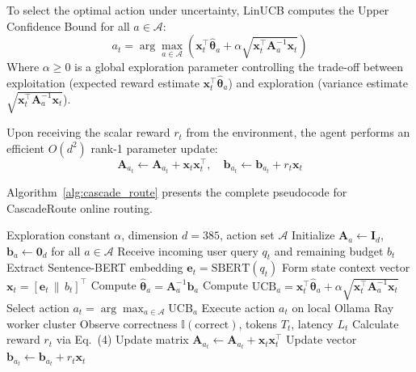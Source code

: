 \documentclass{article}
\begin{document}
To select the optimal action under uncertainty, LinUCB computes the Upper Confidence Bound for all $a \in \mathcal{A}$:
\begin{equation}
    a_t = \arg\max_{a \in \mathcal{A}} \left( \mathbf{x}_t^\top \hat{\boldsymbol{\theta}}_a + \alpha \sqrt{\mathbf{x}_t^\top \mathbf{A}_a^{-1} \mathbf{x}_t} \right)
\label{eq:linucb_select}
\end{equation}
Where $\alpha \ge 0$ is a global exploration parameter controlling the trade-off between exploitation (expected reward estimate $\mathbf{x}_t^\top \hat{\boldsymbol{\theta}}_a$) and exploration (variance estimate $\sqrt{\mathbf{x}_t^\top \mathbf{A}_a^{-1} \mathbf{x}_t}$).

Upon receiving the scalar reward $r_t$ from the environment, the agent performs an efficient $O(d^2)$ rank-1 parameter update:
\begin{equation}
    \mathbf{A}_{a_t} \leftarrow \mathbf{A}_{a_t} + \mathbf{x}_t \mathbf{x}_t^\top, \quad \mathbf{b}_{a_t} \leftarrow \mathbf{b}_{a_t} + r_t \mathbf{x}_t
\end{equation}

Algorithm~\ref{alg:cascade_route} presents the complete pseudocode for CascadeRoute online routing.

\begin{algorithm}[t]
\caption{CascadeRoute: LinUCB LLM Routing Protocol}
\label{alg:cascade_route}
\begin{algorithmic}[1]
\REQUIRE Exploration constant $\alpha$, dimension $d=385$, action set $\mathcal{A}$
\STATE Initialize $\mathbf{A}_a \leftarrow \mathbf{I}_d$, $\mathbf{b}_a \leftarrow \mathbf{0}_d$ for all $a \in \mathcal{A}$
    \STATE Receive incoming user query $q_t$ and remaining budget $b_t$
    \STATE Extract Sentence-BERT embedding $\mathbf{e}_t = \text{SBERT}(q_t)$
    \STATE Form state context vector $\mathbf{x}_t = [\mathbf{e}_t \,\|\, b_t]^\top$
        \STATE Compute $\hat{\boldsymbol{\theta}}_a = \mathbf{A}_a^{-1} \mathbf{b}_a$
        \STATE Compute $\text{UCB}_a = \mathbf{x}_t^\top \hat{\boldsymbol{\theta}}_a + \alpha \sqrt{\mathbf{x}_t^\top \mathbf{A}_a^{-1} \mathbf{x}_t}$
    \ENDFOR
    \STATE Select action $a_t = \arg\max_{a \in \mathcal{A}} \text{UCB}_a$
    \STATE Execute action $a_t$ on local Ollama Ray worker cluster
    \STATE Observe correctness $\mathbb{I}(\text{correct})$, tokens $T_t$, latency $L_t$
    \STATE Calculate reward $r_t$ via Eq.~(4)
    \STATE Update matrix $\mathbf{A}_{a_t} \leftarrow \mathbf{A}_{a_t} + \mathbf{x}_t \mathbf{x}_t^\top$
    \STATE Update vector $\mathbf{b}_{a_t} \leftarrow \mathbf{b}_{a_t} + r_t \mathbf{x}_t$
\ENDFOR
\end{algorithmic}
\end{algorithm}
\end{document}
